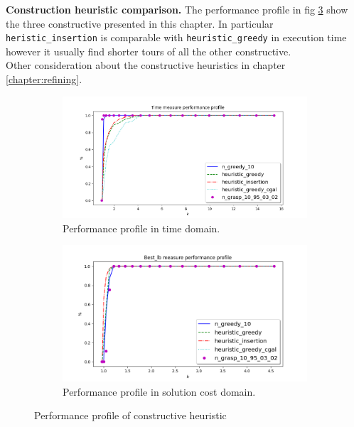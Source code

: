 \textbf{Construction heuristic comparison.} The performance profile in fig \ref{fig:pp_Lconstructives} show the three constructive presented in this chapter. In particular \texttt{heristic\_insertion} is comparable with \texttt{heuristic\_greedy} in execution time however it usually find shorter tours of all the other constructive.\\
Other consideration about the constructive heuristics in chapter \ref{chapter:refining}.

\begin{figure}[!h]
	\centering
	\begin{subfigure}{.9\textwidth}
		\centering
		\includegraphics[width=\columnwidth]{../res/Lconstructives_LA_time.png}
		\caption{Performance profile in time domain.}
		\label{fig:Lconstructives_time}
	\end{subfigure}
	\begin{subfigure}{.9\textwidth}
	\centering
	\includegraphics[width=\columnwidth]{../res/Lconstructives_LA_lb.png}
	\caption{Performance profile in solution cost domain.}
	\label{fig:Lconstructives_lb}
	\end{subfigure}
	\caption{Performance profile of constructive heuristic}
	\label{fig:pp_Lconstructives}
\end{figure}
